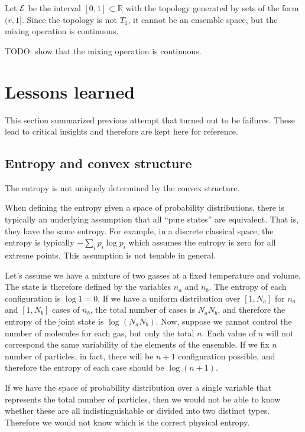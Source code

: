 \begin{example}
	Let $\mathcal{E}$ be the interval $[0,1] \subset \mathbb{R}$ with the topology generated by sets of the form $(r,1]$. Since the topology is not $T_1$, it cannot be an ensemble space, but the mixing operation is continuous.
\end{example}

TODO: show that the mixing operation is continuous.

\section{Lessons learned}

This section summarized previous attempt that turned out to be failures. These lead to critical insights and therefore are kept here for reference.

\subsection{Entropy and convex structure}

\begin{insight}
	The entropy is not uniquely determined by the convex structure.
\end{insight}

When defining the entropy given a space of probability distributions, there is typically an underlying assumption that all ``pure states'' are equivalent. That is, they have the same entropy. For example, in a discrete classical space, the entropy is typically $-\sum_i p_i \log p_i$ which assumes the entropy is zero for all extreme points. This assumption is not tenable in general.

\begin{example}
	Let's assume we have a mixture of two gasses at a fixed temperature and volume. The state is therefore defined by the variables $n_a$ and $n_b$. The entropy of each configuration is $\log 1 = 0$. If we have a uniform distribution over $[1,N_a]$ for $n_a$ and $[1,N_b]$ cases of $n_b$, the total number of cases is $N_a N_b$, and therefore the entropy of the joint state is $\log (N_a N_b)$. Now, suppose we cannot control the number of molecules for each gas, but only the total $n$. Each value of $n$ will not correspond the same variability of the elements of the ensemble. If we fix $n$ number of particles, in fact, there will be $n+1$ configuration possible, and therefore the entropy of each case should be $\log (n+1)$.
	
	If we have the space of probability distribution over a single variable that represents the total number of particles, then we would not be able to know whether these are all indistinguishable or divided into two distinct types. Therefore we would not know which is the correct physical entropy.
\end{example}

